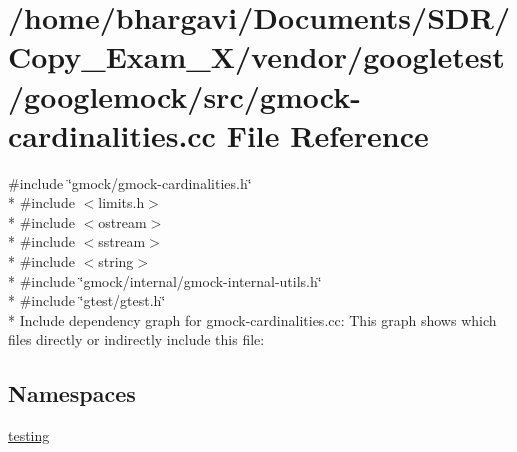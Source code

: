 \hypertarget{gmock-cardinalities_8cc}{}\section{/home/bhargavi/\+Documents/\+S\+D\+R/\+Copy\+\_\+\+Exam\+\_\+X/vendor/googletest/googlemock/src/gmock-\/cardinalities.cc File Reference}
\label{gmock-cardinalities_8cc}
{\ttfamily \#include \char`\"{}gmock/gmock-\/cardinalities.\+h\char`\"{}}\\*
{\ttfamily \#include $<$limits.\+h$>$}\\*
{\ttfamily \#include $<$ostream$>$}\\*
{\ttfamily \#include $<$sstream$>$}\\*
{\ttfamily \#include $<$string$>$}\\*
{\ttfamily \#include \char`\"{}gmock/internal/gmock-\/internal-\/utils.\+h\char`\"{}}\\*
{\ttfamily \#include \char`\"{}gtest/gtest.\+h\char`\"{}}\\*
Include dependency graph for gmock-\/cardinalities.cc\+:
This graph shows which files directly or indirectly include this file\+:
\subsection*{Namespaces}
\begin{DoxyCompactItemize}
\item 
 \hyperlink{namespacetesting}{testing}
\end{DoxyCompactItemize}
